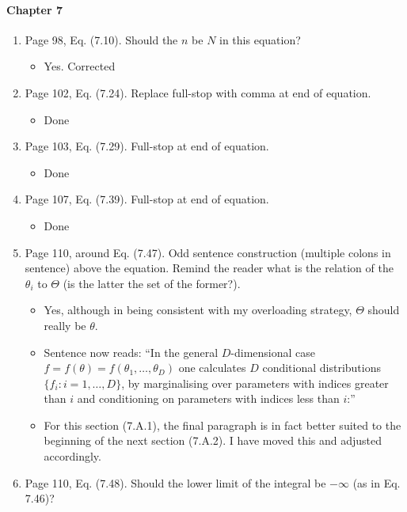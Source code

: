 \documentclass[11pt]{article}
\begin{document}
\paragraph{Chapter 7}
\begin{enumerate}
\item Page 98, Eq. (7.10). Should the $n$ be $N$ in this equation?
    \begin{itemize}
        \item Yes. Corrected
    \end{itemize}
\item Page 102, Eq. (7.24). Replace full-stop with comma at end of
  equation.
  \begin{itemize}
      \item Done
  \end{itemize}
\item Page 103, Eq. (7.29). Full-stop at end of equation.
    \begin{itemize}
        \item Done
    \end{itemize}
\item Page 107, Eq. (7.39). Full-stop at end of equation.
    \begin{itemize}
        \item Done
    \end{itemize}
\item Page 110, around Eq. (7.47). Odd sentence construction (multiple
  colons in sentence) above the equation. Remind the reader what is
  the relation of the $\theta_i$ to $\Theta$ (is the latter the set of
  the former?). 
  \begin{itemize}
      \item Yes, although in being consistent with my overloading strategy, $\Theta$ should really be $\theta$.
      \item Sentence now reads: ``In the general \(D\)-dimensional case \(f=f(\theta)=f(\theta_1,\ldots,\theta_D)\) one calculates \(D\) conditional distributions \(\{f_i:i=1,\ldots,D\}\), by marginalising over parameters with indices greater than \(i\) and conditioning on parameters with indices less than \(i\):''
      \item For this section (7.A.1), the final paragraph is in fact better suited to the beginning of the next section (7.A.2). I have moved this and adjusted accordingly.
  \end{itemize}
\item Page 110, Eq. (7.48). Should the lower limit of the integral be
  $-\infty$ (as in Eq. 7.46)?

\end{enumerate}
\end{document}
